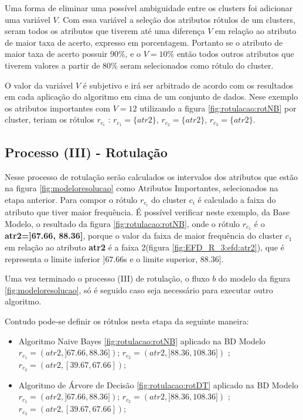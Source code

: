 Uma forma de eliminar uma possível ambiguidade entre os clusters foi adicionar uma variável  ${V}$. Com essa variável a seleção dos atributos rótulos de um clusters, seram todos os atributos que tiverem até uma diferença ${V}$ em relação ao atributo de maior taxa de acerto, expresso em porcentagem. Portanto se o atributo de maior taxa de acerto possuir ${90\%}$, e o ${V=10\%}$  então todos outros atributos que tiverem valores a partir de ${80\%}$ seram selecionados como rótulo do cluster.  

O valor da variável ${V}$ é subjetivo e irá ser arbitrado de acordo com os resultados em cada aplicação do algoritmo em cima de um conjunto de dados. Nese exemplo os atributos importantes com ${V=12}$ utilizando a figura \ref{fig:rotulacao:rotNB} por cluster, teriam os rótulos ${r_{c_i}}$ : ${r_{c_1}=\{atr2\}}$, ${r_{c_2}=\{atr2\}}$, ${r_{c_3}=\{atr2\}}$.

\subsection{Processo (III) - Rotulação}

Nesse processo de rotulação serão calculados os intervalos dos atributos que estão na figura \ref{fig:modeloresolucao} como Atributos Importantes, selecionados na etapa anterior. Para compor o rótulo ${r_{c_i}}$ do cluster ${c_i}$ é calculado a faixa do atributo  que tiver maior frequência. 
É possível verificar neste exemplo, da Base Modelo, o resultado da figura \ref{fig:rotulacao:rotNB}, onde o rótulo ${r_{c_1}}$ é o  \textbf{atr2=]67.66, 88.36]}, porque o valor da faixa de maior frequência do cluster ${c_1}$ em relação ao atributo \textbf{atr2} é a faixa 2(figura \ref{fig:EFD_R_3:efd:atr2}), que é representa o limite inferior ${]67.66}$s e o limite superior, ${88.36]}$.

Uma vez terminado o processo (III) de rotulação, o fluxo ${b}$ do modelo da figura \ref{fig:modeloresolucao}, só é seguido caso seja necessário para executar outro algoritmo.

Contudo pode-se definir os rótulos nesta etapa da seguinte maneira:


\begin{itemize}[noitemsep]
            \item Algoritmo Naive Bayes  \ref{fig:rotulacao:rotNB} aplicado na BD Modelo
            \subitem ${r_{c_1}=(atr2,]67.66, 88.36])}$;
            \subitem ${r_{c_2}=(atr2,]88.36, 108.36])}$ ;
            \subitem ${r_{c_3}=(atr2,[39.67, 67.66])}$;
            
            \item Algoritmo de Árvore de Decisão  \ref{fig:rotulacao:rotDT} aplicado na BD Modelo
            \subitem ${r_{c_1}=(atr2,]67.66, 88.36])}$;
            \subitem ${r_{c_2}=(atr2,]88.36, 108.36])}$ ;
            \subitem ${r_{c_3}=(atr2,[39.67, 67.66])}$;
\end{itemize}

